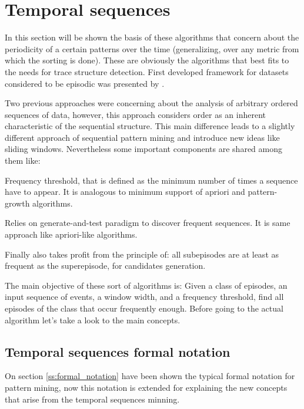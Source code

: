\section{Temporal sequences}\label{ss:temporal_sequences}

In this section will be shown the basis of these algorithms that concern about
the periodicity of a certain patterns over the time (generalizing, over any
metric from which the sorting is done). These are obviously the
algorithms that best fits to the needs for trace structure detection. First
developed framework for datasets considered to be episodic was presented by
\cite{mannila1995discovering}.

Two previous approaches were concerning about the analysis of arbitrary ordered
sequences of data, however, this approach considers order as an inherent
characteristic of the sequential structure. This main difference leads to a
slightly different approach of sequential pattern mining and introduce new ideas 
like sliding windows. Nevertheless some important components are shared among 
them like:
\begin{enumerate*}[label=(\roman*)]
  \item Frequency threshold, that is defined as the minimum number of times a
    sequence have to appear. It is analogous to minimum support of apriori and
    pattern-growth algorithms.
  \item Relies on generate-and-test paradigm to discover frequent sequences. It
    is same approach like apriori-like algorithms.
  \item Finally also takes profit from the principle of: all subepisodes are at
    least as frequent as the superepisode, for candidates generation.
\end{enumerate*}

The main objective of these sort of algorithms is: Given a class of episodes, an
input sequence of events, a window width, and a frequency threshold, find all
episodes of the class that occur frequently enough. Before going to the actual 
algorithm let's take a look to the main concepts.

\subsection{Temporal sequences formal notation}

On section \ref{ss:formal_notation} have been shown the typical formal notation
for pattern mining, now this notation is extended for explaining the new
concepts that arise from the temporal sequences minning.

